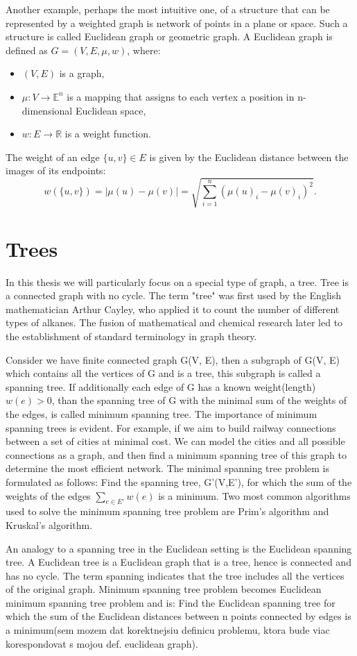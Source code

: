 \documentclass[12pt]{book}
\begin{document}
		Another example, perhaps the most intuitive one, of a structure that can be represented by a weighted graph is network of points in a plane or space. Such a structure is called Euclidean graph or geometric graph.
		A Euclidean graph is defined as \( G = (V, E, \mu, w) \), where:
		\begin{itemize}
			\item \( (V, E) \) is a graph,
			\item \( \mu : V \to \mathbb{E}^n \) is a mapping that assigns to each vertex a position in n-dimensional Euclidean space,
			\item \( w : E \to \mathbb{R} \) is a weight function.
		\end{itemize}
		The weight of an edge \( \{u,v\} \in E \) is given by the Euclidean distance between the images of its endpoints:
		\[
		w(\{u,v\}) = |\mu(u) - \mu(v)| = \sqrt{ \sum_{i=1}^{n} (\mu(u)_i - \mu(v)_i)^2 }.
		\]
		
	\section{Trees}
		In this thesis we will particularly focus on a special type of graph, a tree.
		Tree is a connected graph with no cycle.
		The term "tree" was first used by the English mathematician Arthur Cayley, who applied it to count the number of different types of alkanes. The fusion of mathematical and chemical research later led to the establishment of standard terminology in graph theory.
		
		Consider we have finite connected graph G(V, E), then a subgraph of G(V, E) which contains all the vertices of G and is a tree, this subgraph is called a spanning tree. If additionally each edge of G has a known weight(length) \(w(e)>0\), than the spanning tree of G with the minimal sum of the weights of the edges, is called minimum spanning tree. The importance of minimum spanning trees is evident. For example, if we aim to build railway connections between a set of cities at minimal cost. We can model the cities and all possible connections as a graph, and then find a minimum spanning tree of this graph to determine the most efficient network. 
		The minimal spanning tree problem is formulated as follows: Find the spanning tree, G'(V,E'), for which the sum of the weights of the edges \( \sum_{e \in E'} w(e)\) is a minimum. Two most common algorithms used to solve the minimum spanning tree problem are Prim's algorithm and Kruskal's algorithm.
		
		An analogy to a spanning tree in the Euclidean setting is the Euclidean spanning tree. A Euclidean tree is a Euclidean graph that is a tree, hence is connected and has no cycle. The term spanning indicates that the tree includes all the vertices of the original graph. Minimum spanning tree problem becomes Euclidean minimum spanning tree problem and is: Find the Euclidean spanning tree for which the sum of the Euclidean distances between n points connected by edges is a minimum(sem mozem dat korektnejsiu definicu problemu, ktora bude viac korespondovat s mojou def. euclidean graph). 
		
\end{document}
